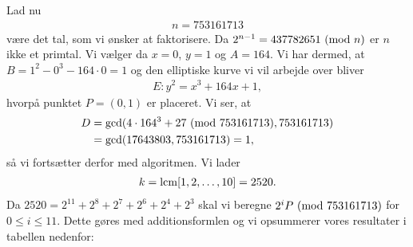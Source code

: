 \begin{example}
Lad nu 
\begin{align*}
	n = 753161713
\end{align*}
være det tal, som vi ønsker at faktorisere. Da $2^{n-1} = 437782651 \ (\mathrm{mod} \ n)$ er $n$ ikke et primtal. Vi vælger da
$x = 0$, $y = 1$ og $A=164$. Vi har dermed, at $B = 1^2 - 0^3 - 164 \cdot 0 = 1$ og den elliptiske kurve vi vil arbejde over bliver
\begin{align*}
	E : y^2 = x^3 + 164x + 1,
\end{align*}
hvorpå punktet $P=(0, 1)$ er placeret. Vi ser, at 
\begin{align*}
	D &= \gcd(4 \cdot 164^3 + 27 \ (\mathrm{mod} \ 753161713), 753161713) \\ &= \gcd(17643803, 753161713) = 1,
\end{align*}
så vi fortsætter derfor med algoritmen. Vi lader
\begin{align*}
	k = \mathrm{lcm}[1, 2, \ldots, 10] = 2520.
\end{align*}
Da $2520 = 2^{11} + 2^8 + 2^7 + 2^6 + 2^4 + 2^3$ skal vi beregne $2^i P \ (\mathrm{mod} \ 753161713)$ for $0 \leq i \leq 11$. Dette gøres med additionsformlen og vi opsummerer vores resultater i tabellen nedenfor:


\end{example}
